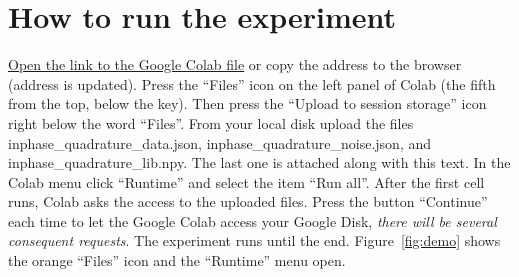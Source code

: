 \documentclass[12pt]{article}
\begin{document}
\section{How to run the experiment}\label{sec:experiment}
\href{https://colab.research.google.com/drive/1wWEw8jcj8logartpd89VT_bX1jcP_VBb?usp=sharing}{Open the link to the Google Colab file} or copy the address to the browser (address is updated). 
Press the ``Files'' icon on the left panel of Colab (the fifth from the top, below the key). Then press the ``Upload to session storage'' icon right below the word ``Files''.  From your local disk upload the files \textsf{inphase\_quadrature\_data.json}, \textsf{inphase\_quadrature\_noise.json}, and \textsf{inphase\_quadrature\_lib.npy}. The last one is attached along with this text. In the Colab menu click ``Runtime'' and select the item ``Run all''. After the first cell runs, Colab asks the access to the uploaded files. Press the button ``Continue'' each time to let the Google Colab access your Google Disk, \emph{there will be several consequent requests}. The experiment runs until the end. Figure~\ref{fig:demo} shows the orange ``Files'' icon and the ``Runtime'' menu open.\sloppy{}



\end{document}
